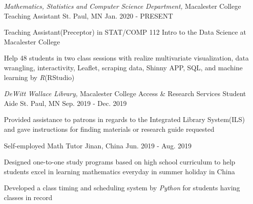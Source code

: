 

\begin{cventries}

  \cventry
    {\textit{Mathematics, Statistics and Computer Science Department,} Macalester College} %
    {Teaching Assistant} %
    {St. Paul, MN} %
    {Jan. 2020 - PRESENT} %
    {
      \begin{cvitems} %
        \item {Teaching Assistant(Preceptor) in STAT/COMP 112 Intro to the Data Science at Macalester College}
        \item {Help 48 students in two class sessions with realize multivariate visualization, data wrangling, interactivity, Leaflet, scraping data, Shinny APP, SQL, and machine learning by  \textit{R}(RStudio)}
      \end{cvitems}
    }

  \cventry
    {\textit{DeWitt Wallace Library,} Macalester College} %
    {Access \& Research Services Student Aide} %
    {St. Paul, MN} %
    {Sep. 2019 - Dec. 2019} %
    {
      \begin{cvitems} %
        \item {Provided assistance to patrons in regards to the Integrated Library System(ILS) and gave instructions for finding materials or research guide requested}
      \end{cvitems}
    }

   \cventry
    {Self-employed} %
    {Math Tutor} %
    {Jinan, China} %
    {Jun. 2019 - Aug. 2019} %
    {
      \begin{cvitems} %
        \item {Designed one-to-one study programs based on high school curriculum to help students excel in learning mathematics everyday in summer holiday in China}
        \item {Developed a class timing and scheduling system by \textit{Python} for students having classes in record}
      \end{cvitems}
    }
    

\end{cventries}

